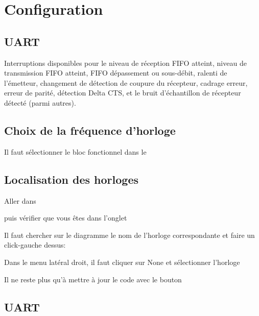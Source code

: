 \chapter{Configuration}

\section{UART}
Interruptions disponibles pour le niveau de réception FIFO atteint, niveau de transmission FIFO atteint, FIFO 
dépassement ou sous-débit, ralenti de l’émetteur, changement de détection de coupure du récepteur, cadrage 
erreur, erreur de parité, détection Delta CTS, et le bruit d’échantillon de récepteur détecté (parmi 
autres). 



\section{Choix de la fréquence d'horloge}

Il faut sélectionner le bloc fonctionnel dans le  

\section{Localisation des horloges}

Aller dans 

puis vérifier que vous êtes dans l'onglet 



Il faut chercher sur le diagramme le nom de l'horloge correspondante et faire un click-gauche dessus: 




Dans le menu latéral droit, il faut cliquer sur None et sélectionner l'horloge 



Il ne reste plus qu'à mettre à jour le code avec le bouton 





\section{UART}

